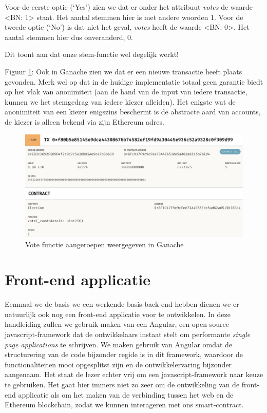 	Voor de eerste optie (`Yes') zien we dat er onder het attribuut \textit{votes} de waarde <BN: 1> staat. Het aantal stemmen hier is met andere woorden 1.
	Voor de tweede optie (`No') is dat niet het geval, \textit{votes} heeft de  waarde <BN: 0>. Het aantal stemmen hier dus onveranderd, 0.
	
	Dit toont aan dat onze stem-functie wel degelijk werkt! 
	
	Figuur \ref{fig:contracts-ganache3}: Ook in Ganache zien we dat er een  nieuwe transactie heeft plaats gevonden. Merk wel op dat in de huidige implementatie totaal geen garantie biedt op het vlak van anonimiteit (aan de hand van de input van iedere transactie, kunnen we het stemgedrag  van iedere kiezer afleiden). Het enigste wat de anonimiteit van een kiezer enigszins beschermt is de abstracte aard van accounts, de kiezer is alleen bekend via zijn Ethereum adres. 
	\begin{figure}
		\includegraphics[width=\linewidth]{img/contracts-ganache3.png}
		\caption{Vote functie aangeroepen weergegeven in Ganache}
		\label{fig:contracts-ganache3}
	\end{figure}

	\section{Front-end applicatie}
	Eenmaal we de basis we een werkende basis back-end hebben dienen we er natuurlijk ook nog een front-end applicatie voor te ontwikkelen. In deze handleiding zullen we gebruik maken van een Angular, een open source javascript-framework dat de ontwikkelaars instaat stelt om performante \textit{single page applications} te schrijven. We maken gebruik van Angular omdat de structurering  van de code bijzonder regide is in dit framework, waardoor de functionaliteiten mooi opgesplitst zijn en de ontwikkelervaring bijzonder aangenaam.  Het staat de lezer echter vrij om een javascript-framework naar keuze te gebruiken. Het gaat hier  immers niet zo zeer om de ontwikkeling van de front-end applicatie als om het maken van de verbinding tussen het web  en de Ethereum blockchain, zodat we kunnen interageren met ons smart-contract. 
	
